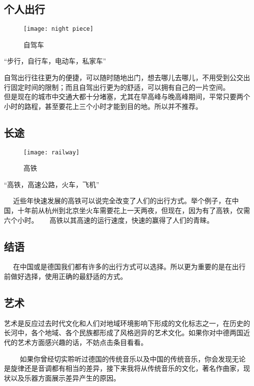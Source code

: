 \subsection{个人出行}

\begin{figure}[htb]
    \centering
    \texttt{[image: night piece]}
    \caption{自驾车}
\end{figure}

    “步行，自行车，电动车，私家车” 

    自驾出行往往更为的便捷，可以随时随地出门，想去哪儿去哪儿，不用受到公交出行固定时间的限制；而且自驾出行更为的舒适，可以拥有自己的一片空间。 
    
    但是现在的城市中交通大都十分堵塞，尤其在早高峰与晚高峰期间，平常只要两个小时的路程，甚至要花上三个小时才能到目的地。所以并不推荐。

\subsection{长途}
\begin{figure}[htb]
    \centering
    \texttt{[image: railway]}
    \caption{高铁}
\end{figure}

    “高铁，高速公路，火车，飞机” 

    近些年快速发展的高铁可以说完全改变了人们的出行方式。举个例子，在中国，十年前从杭州到北京坐火车需要花上一天两夜，但现在，因为有了高铁，仅需六个小时。 
    
    高铁以其高速的运行速度，快速的赢得了人们的青睐。

\subsection{结语}
    在中国或是德国我们都有许多的出行方式可以选择。所以更为重要的是在出行前做好选择，使用正确的最舒适的方式。



\subsection{艺术}
    艺术是反应过去时代文化和人们对地域环境影响下形成的文化标志之一，在历史的长河中，各个地域、各个民族都形成了风格迥异的艺术文化。如果你对中德两国近代的艺术方面感兴趣的话，不妨点击条目看看。

    如果你曾经切实聆听过德国的传统音乐以及中国的传统音乐，你会发现无论是旋律还是音调都有相当的差异，接下来我将从传统音乐的文化，著名作曲家，现状以及乐器方面展示差异产生的原因。

